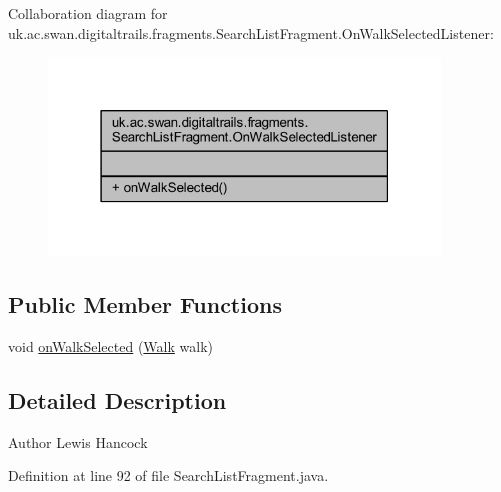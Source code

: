 Collaboration diagram for uk.\+ac.\+swan.\+digitaltrails.\+fragments.\+Search\+List\+Fragment.\+On\+Walk\+Selected\+Listener\+:
\nopagebreak
\begin{figure}[H]
\begin{center}
\leavevmode
\includegraphics[width=295pt]{interfaceuk_1_1ac_1_1swan_1_1digitaltrails_1_1fragments_1_1_search_list_fragment_1_1_on_walk_selected_listener__coll__graph}
\end{center}
\end{figure}
\subsection*{Public Member Functions}
\begin{DoxyCompactItemize}
\item 
void \hyperlink{interfaceuk_1_1ac_1_1swan_1_1digitaltrails_1_1fragments_1_1_search_list_fragment_1_1_on_walk_selected_listener_a409108bc8754bafbf33e6b4fae4dad4d}{on\+Walk\+Selected} (\hyperlink{classuk_1_1ac_1_1swan_1_1digitaltrails_1_1components_1_1_walk}{Walk} walk)
\end{DoxyCompactItemize}


\subsection{Detailed Description}
\begin{DoxyAuthor}{Author}
Lewis Hancock 
\end{DoxyAuthor}


Definition at line 92 of file Search\+List\+Fragment.\+java.



